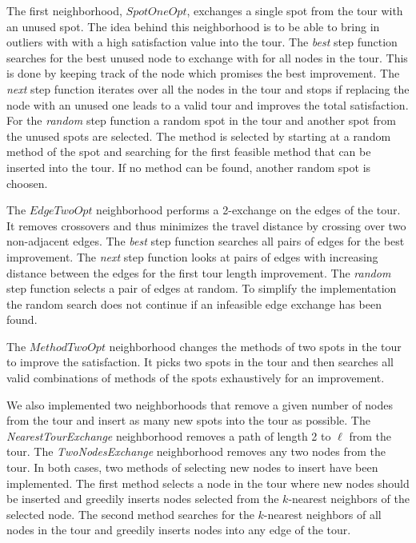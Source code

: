 \documentclass{article}
\begin{document}
The first neighborhood, $SpotOneOpt$, exchanges a single spot from the tour with an unused spot. The idea behind this neighborhood is to
be able to bring in outliers with with a high satisfaction value into the tour.
The \emph{best} step function searches for the best unused node to exchange with for all nodes in the tour.
This is done by keeping track of the node which promises the best improvement. %
The \emph{next} step function iterates over all the nodes in the tour and stops if replacing the node with an unused one leads to a valid
tour and improves the total satisfaction. 
For the \emph{random} step function a random spot in the tour and another spot from the unused spots are selected. 
The method is selected by starting at a random method of the spot and searching for the first feasible method that can be inserted into the
tour. If no method can be found, another random spot is choosen.

The $EdgeTwoOpt$ neighborhood performs a 2-exchange on the edges of the tour. It removes crossovers and thus minimizes the travel distance
by crossing over two non-adjacent edges. 
The \emph{best} step function searches all pairs of edges for the best improvement. The \emph{next} step function looks at pairs of edges
with increasing distance between the edges for the first tour length improvement. The \emph{random} step function selects a pair of edges at
random. To simplify the implementation the random search does not continue if an infeasible edge exchange has been found.

The $MethodTwoOpt$ neighborhood changes the methods of two spots in the tour to improve the satisfaction. It picks two spots in the tour and
then searches all valid combinations of methods of the spots exhaustively for an improvement.

\medskip
We also implemented two neighborhoods that remove a given number of nodes from the tour and insert as many new spots into the tour as
possible. The \emph{NearestTourExchange} neighborhood removes a path of length 2 to $\ell$ from the tour. The \emph{TwoNodesExchange} neighborhood removes
any two nodes from the tour. In both cases, two methods of selecting new nodes to insert have been implemented. The first method selects a
node in the tour where new nodes should be inserted and greedily inserts nodes selected from the $k$-nearest neighbors of the selected node.
The second method searches for the $k$-nearest neighbors of all nodes in the tour and greedily inserts nodes into any edge of the tour.
\end{document}
